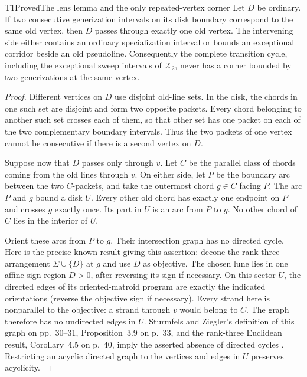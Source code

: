 \begin{resultenv}{T1}{Proved}{The lens lemma and the only repeated-vertex corner}
Let $D$ be ordinary. If two consecutive generization intervals on its
disk boundary correspond to the same old vertex, then $D$ passes through
exactly one old vertex. The intervening side either contains an ordinary
specialization interval or bounds an exceptional corridor beside an old
pseudoline. Consequently the complete transition cycle, including the
exceptional sweep intervals of $\mathcal X_2$, never has a corner bounded
by two generizations at the same vertex.
\end{resultenv}
\begin{proof}
Different vertices on $D$ use disjoint old-line sets. In the disk, the
chords in one such set are disjoint and form two opposite packets. Every
chord belonging to another such set crosses each of them, so that other
set has one packet on each of the two complementary boundary intervals.
Thus the two packets of one vertex cannot be consecutive if there is a
second vertex on $D$.

Suppose now that $D$ passes only through $v$. Let $C$ be the parallel
class of chords coming from the old lines through $v$. On either side,
let $P$ be the boundary arc between the two $C$-packets, and take the
outermost chord $g\in C$ facing $P$. The arc $P$ and $g$ bound a disk
$U$. Every other old chord has exactly one endpoint on $P$ and crosses
$g$ exactly once. Its part in $U$ is an arc from $P$ to $g$. No other
chord of $C$ lies in the interior of $U$.

Orient these arcs from $P$ to $g$. Their intersection graph has no
directed cycle. Here is the precise known result giving this assertion:
decone the rank-three arrangement $\Sigma\cup\{D\}$ at $g$ and use
$D$ as objective. The chosen lune lies in one affine sign region
$D>0$, after reversing its sign if necessary. On this sector $U$, the directed edges
of its oriented-matroid program are exactly the indicated orientations
(reverse the objective sign if necessary). Every strand here is
nonparallel to the objective: a strand through $v$ would belong to $C$.
The graph therefore has no undirected edges in $U$.
Sturmfels and Ziegler's definition of this graph on pp.~30--31,
Proposition~3.9 on p.~33, and the rank-three Euclidean result,
Corollary~4.5 on p.~40, imply the asserted absence of directed cycles
\cite{SturmfelsZiegler1993}. Restricting an acyclic directed graph to
the vertices and edges in $U$ preserves acyclicity.


\end{proof}

